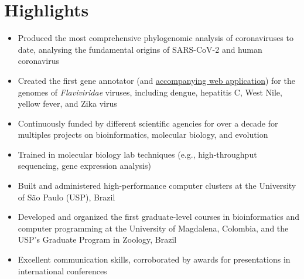 
\vspace{-2.5em}



\section{Highlights}

    \begin{itemize}
        \item Produced the most comprehensive phylogenomic analysis of coronaviruses to date, analysing the fundamental origins of SARS-CoV-2 and human coronavirus
        \item Created the first gene annotator (and \href{http://flavi-web.com/}{accompanying web application}) for the genomes of \textit{Flaviviridae} viruses, including dengue, hepatitis C, West Nile, yellow fever, and Zika virus
        \item Continuously funded by different scientific agencies for over a decade for multiples projects on bioinformatics, molecular biology, and evolution
        \item Trained in molecular biology lab techniques (e.g., high-throughput sequencing, gene expression analysis)
        \item Built and administered high-performance computer clusters at the University of São Paulo (USP), Brazil
        \item Developed and organized the first graduate-level courses in bioinformatics and computer programming at the University of Magdalena, Colombia, and the USP's Graduate Program in Zoology, Brazil
        \item Excellent communication skills, corroborated by awards for presentations in international conferences
    \end{itemize}
